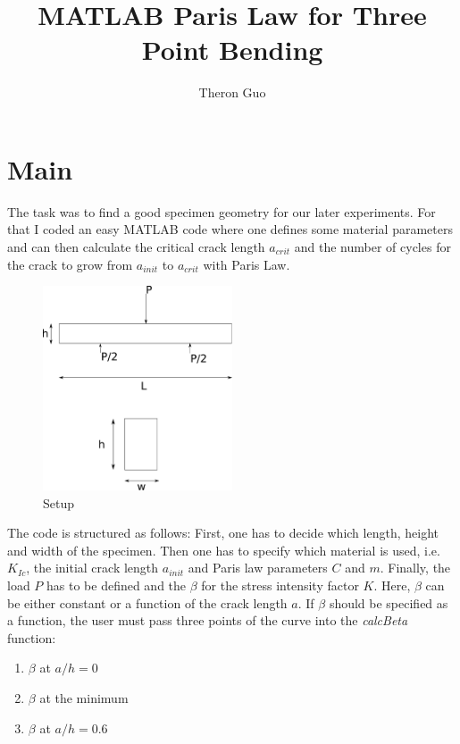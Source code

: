 \documentclass{article}
\title{MATLAB Paris Law for Three Point Bending}
\author{Theron Guo}
\begin{document}
\maketitle
\chapter{Main}
The task was to find a good specimen geometry for our later experiments. For that I coded an easy MATLAB code where one defines some material parameters and can then calculate the critical crack length $a_{crit}$ and the number of cycles for the crack to grow from $a_{init}$ to $a_{crit}$ with Paris Law. 

\begin{figure}[htbp]
	\centering
	\includegraphics[width=0.5\textwidth]{output}
	\caption{Setup}
\end{figure}

The code is structured as follows: First, one has to decide which length, height and width of the specimen. Then one has to specify which material is used, i.e. $K_{Ic}$, the initial crack length $a_{init}$ and Paris law parameters $C$ and $m$.
Finally, the load $P$ has to be defined and the $\beta$ for the stress intensity factor $K$. Here, $\beta$ can be either constant or a function of the crack length $a$. If $\beta$ should be specified as a function, the user must pass three points of the curve into the \textit{calcBeta} function:
\begin{enumerate}
	\item $\beta$ at $a/h=0$
	\item $\beta$ at the minimum
	\item $\beta$ at $a/h=0.6$
\end{enumerate}
\end{document}
